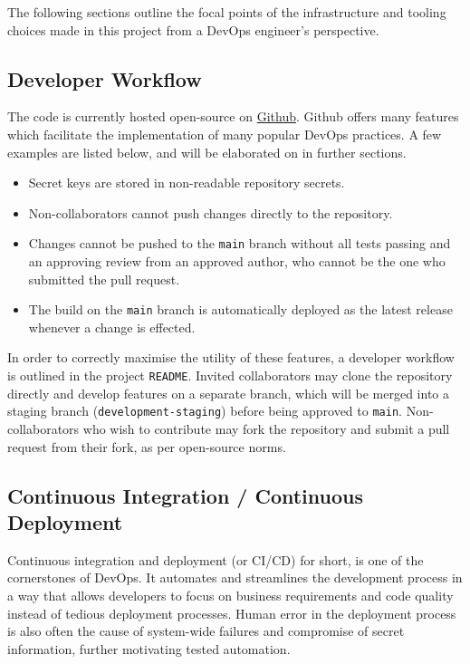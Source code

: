 The following sections outline the focal points of the infrastructure and tooling choices made in this project from a DevOps engineer's perspective.

\subsection{Developer Workflow}
The code is currently hosted open-source on \href{https://github.com/Darrekt/within-react-native}{Github}. Github offers many features which facilitate the implementation of many popular DevOps practices. A few examples are listed below, and will be elaborated on in further sections.

\begin{itemize}
    \item Secret keys are stored in non-readable repository secrets.
    \item Non-collaborators cannot push changes directly to the repository.
    \item Changes cannot be pushed to the \texttt{main} branch without all tests passing and an approving review from an approved author, who cannot be the one who submitted the pull request.
    \item The build on the \texttt{main} branch is automatically deployed as the latest release whenever a change is effected.
\end{itemize}

In order to correctly maximise the utility of these features, a developer workflow is outlined in the project \texttt{README}. Invited collaborators may clone the repository directly and develop features on a separate branch, which will be merged into a staging branch (\texttt{development-staging}) before being approved to \texttt{main}. Non-collaborators who wish to contribute may fork the repository and submit a pull request from their fork, as per open-source norms.

\subsection{Continuous Integration / Continuous Deployment}
Continuous integration and deployment (or CI/CD) for short, is one of the cornerstones of DevOps. It automates and streamlines the development process in a way that allows developers to focus on business requirements and code quality instead of tedious deployment processes. Human error in the deployment process is also often the cause of system-wide failures and compromise of secret information, further motivating tested automation.

